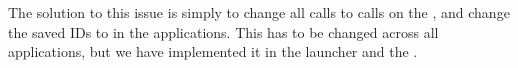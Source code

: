 \\\\
The solution to this issue is simply to change all  calls to  calls on the , and change the saved IDs to  in the applications. This has to be changed across all applications, but we have implemented it in the launcher and the \ct. 

